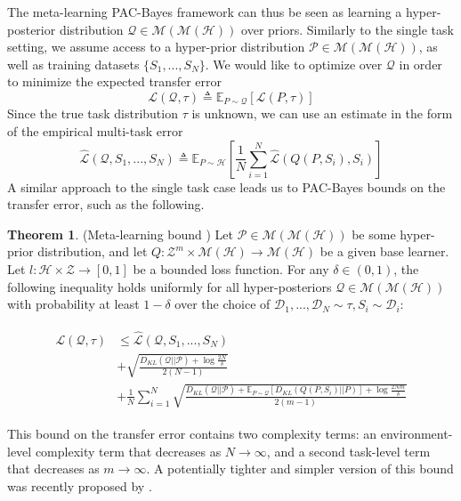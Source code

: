 \documentclass{article}
\theoremstyle{definition}
\newtheorem{theorem}{Theorem}[section]
\newcommand{\Expect}[2]{\mathbb{E}_{#1}\left [#2 \right ]}
\begin{document}
The meta-learning PAC-Bayes framework can thus be seen as learning a hyper-posterior distribution $\mathcal{Q}\in \mathcal{M}(\mathcal{M}(\mathcal{H}))$ over priors. Similarly to the single task setting, we assume access to a hyper-prior distribution $\mathcal{P}\in \mathcal{M}(\mathcal{M}(\mathcal{H}))$, as well as training datasets $\{S_1,...,S_N\}$.
We would like to optimize over $\mathcal{Q}$ in order to minimize the expected transfer error $$\mathcal{L}(\mathcal{Q}, \tau) \triangleq \Expect{P\sim \mathcal{Q}}{\mathcal{L}(P, \tau)}$$
Since the true task distribution $\tau$ is unknown, we can use an estimate in the form of the empirical multi-task error $$\hat{\mathcal{L}}(\mathcal{Q}, S_1,...,S_N)\triangleq \Expect{P\sim \mathcal{H}}{\frac{1}{N}\sum_{i=1}^{N}\hat{\mathcal{L}}(Q(P, S_i), S_i)}$$
A similar approach to the single task case leads us to PAC-Bayes bounds on the transfer error, such as the following.

\begin{theorem} (Meta-learning bound \citep{Amit2018}) \label{thm:meta-pb}
	Let $\mathcal{P}\in \mathcal{M}(\mathcal{M}(\mathcal{H}))$ be some hyper-prior distribution, and let $Q: \mathcal{Z}^m\times\mathcal{M}(\mathcal{H})\rightarrow \mathcal{M}(\mathcal{H})$ be a given base learner. Let $l: \mathcal{H}\times \mathcal{Z}\rightarrow [0, 1]$ be a bounded loss function.
	For any $\delta \in (0,1)$, the following inequality holds uniformly for all hyper-posteriors $\mathcal{Q}\in \mathcal{M}(\mathcal{M}(\mathcal{H}))$ with probability at least $1-\delta$ over the choice of $\mathcal{D}_1,...,\mathcal{D}_N\sim \tau, S_i\sim \mathcal{D}_i$:
	
	\begin{align} \label{eq:meta-pb-amit}
	\begin{split}
	\mathcal{L}(\mathcal{Q}, \tau) &\leq \hat{\mathcal{L}}(\mathcal{Q}, S_1,...,S_N) \\
	&+\sqrt{\frac{D_{KL}(\mathcal{Q}||\mathcal{P})+\log\frac{2N}{\delta}}{2(N-1)}} \\
	&+\frac{1}{N}\sum_{i=1}^{N}\sqrt{\frac{D_{KL}(\mathcal{Q}||\mathcal{P})+\Expect{P\sim \mathcal{Q}}{D_{KL}(Q(P,S_i)||P)}+\log\frac{2Nm}{\delta}}{2(m-1)}}
	\end{split}
	\end{align}
	
\end{theorem}

This bound on the transfer error contains two complexity terms: an environment-level complexity term that decreases as $N\rightarrow \infty$, and a second task-level term that decreases as $m\rightarrow \infty$. A potentially tighter and simpler version of this bound was recently proposed by \cite{Rothfuss2020}.
\end{document}
